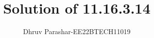 \documentclass[journal,12pt,twocolumn]{IEEEtran}
\theoremstyle{remark}
\begin{document}
%




\vspace{3cm}

\title{ 
Solution of 11.16.3.14
}
\author{ Dhruv Parashar-EE22BTECH11019
}	


%
%
%

% 
%



% 
\end{document}
